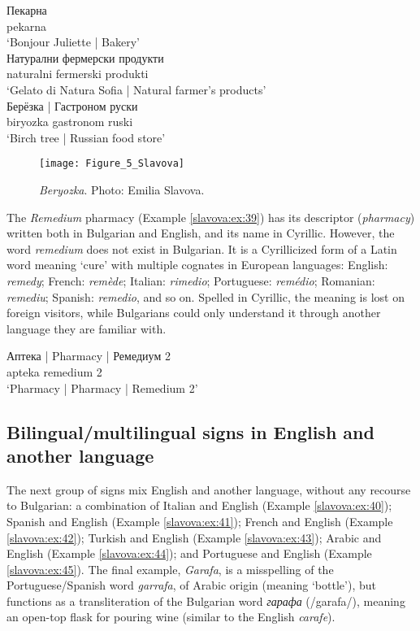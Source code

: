 \documentclass[output=paper]{langscibook}
\begin{document}
\begin{exe}
  \ex\label{slavova:ex:36}
   Пекарна \\
  { } pekarna \\
  \glt ‘Bonjour Juliette | Bakery’ \\
  \ex\label{slavova:ex:37}
   Натурални фермерски продукти \\
  { } naturalni fermerski produkti \\
  \glt ‘Gelato di Natura Sofia | Natural farmer’s products’ \\
  \ex\label{slavova:ex:38}
  \gll Берёзка | Гастроном руски \\
  biryozka { } gastronom ruski \\
  \glt ‘Birch tree | Russian food store’
\end{exe}

\begin{figure} %
  \texttt{[image: Figure\_5\_Slavova]}
  \caption{\textit{Beryozka}. Photo: Emilia Slavova.}
  \label{slavova:fig:5}
\end{figure}


The \textit{Remedium} pharmacy (Example \ref{slavova:ex:39}) has its descriptor (\textit{pharmacy}) written both in Bulgarian and English, and its name in Cyrillic. However, the word \textit{remedium} does not exist in Bulgarian. It is a Cyrillicized form of a Latin word meaning ‘cure’ with multiple cognates in European languages: English: \textit{remedy}; French: \textit{remède}; Italian: \textit{rimedio}; Portuguese: \textit{remédio}; Romanian: \textit{remediu}; Spanish: \textit{remedio}, and so on. Spelled in Cyrillic, the meaning is lost on foreign visitors, while Bulgarians could only understand it through another language they are familiar with.

\begin{exe}
  \ex\label{slavova:ex:39}
  \gll Аптека {| Pharmacy |} Ремедиум 2 \\
  apteka { } remedium 2 \\
  \glt ‘Pharmacy | Pharmacy | Remedium 2’
\end{exe}

\subsection{Bilingual/multilingual signs in English and another language}
The next group of signs mix English and another language, without any recourse to Bulgarian: a combination of Italian and English (Example \ref{slavova:ex:40}); Spanish and English (Example \ref{slavova:ex:41}); French and English (Example \ref{slavova:ex:42}); Turkish and English (Example \ref{slavova:ex:43}); Arabic and English (Example \ref{slavova:ex:44}); and Portuguese and English (Example \ref{slavova:ex:45}). The final example, \textit{Garafa}, is a misspelling of the Portuguese/Spanish word \textit{garrafa}, of Arabic origin (meaning ‘bottle’), but functions as a transliteration of the Bulgarian word \textit{гарафа} (/garafa/), meaning an open-top flask for pouring wine (similar to the English \textit{carafe}).
\end{document}
